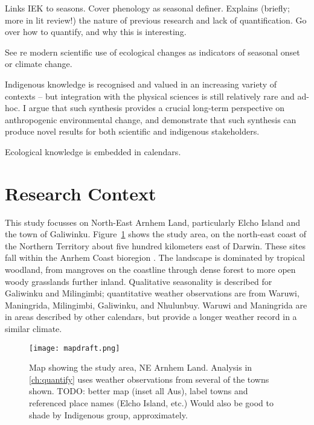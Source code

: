Links IEK to seasons.  Cover phenology as seasonal definer.
Explains (briefly; more in lit review!) the nature of previous research
and lack of quantification.  Go over how to quantify, and why
this is interesting.


See \citet{menzel2006} re modern scientific use of ecological changes
as indicators of seasonal onset or climate change.


Indigenous knowledge is recognised and valued in an increasing variety
of contexts \citep[eg.][]{petheram2010,cochran2015,berkes2012} –
but integration with the physical sciences is still relatively rare and ad-hoc.
%
I argue that such synthesis provides a crucial long-term perspective on
anthropogenic environmental change, and demonstrate that such synthesis
can produce novel results for both scientific and indigenous stakeholders.

Ecological knowledge is embedded in calendars.




\section{Research Context}
\label{sec:context}

This study focusses on North-East Arnhem Land, particularly Elcho Island
and the town of Galiwinku.  Figure~\ref{fig:arnhem-map} shows the study
area, on the north-east coast of the Northern Territory about five hundred
kilometers east of Darwin.
%
These sites fall within the Anrhem Coast bioregion \citep{ens2014}.
The landscape is dominated by tropical woodland, from mangroves on the coastline
through dense forest to more open woody grasslands further inland.
%
Qualitative seasonality is described for Galiwinku and Milingimbi;
quantitative weather observations are from Waruwi, Maningrida, Milingimbi,
Galiwinku, and Nhulunbuy.  Waruwi and Maningrida are in areas described by
other calendars, but provide a longer weather record in a similar climate.

\begin{figure}[h]
    \centering
    \texttt{[image: mapdraft.png]}
    \caption[Map showing the study area, NE Arnhem Land]{
        Map showing the study area, NE Arnhem Land.
        Analysis in \autoref{ch:quantify} uses weather observations from several of the towns shown.
        TODO:  better map (inset all Aus), label towns and referenced place names
        (Elcho Island, etc.)
        Would also be good to shade by Indigenous group, approximately.
        }
    \label{fig:arnhem-map}
\end{figure}

